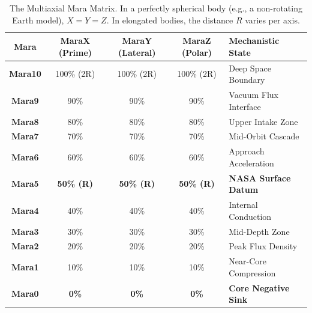 \documentclass[11pt, a4paper]{article}
\begin{document}
\begin{table}[!ht]
  \centering
  \begin{tabular}{|c|c|c|c|l|}
    \hline
    \textbf{Mara} & \textbf{MaraX (Prime)} & \textbf{MaraY (Lateral)} & \textbf{MaraZ (Polar)} & \textbf{Mechanistic State} \\ \hline
    \textbf{Mara10} & 100\% (2R) & 100\% (2R) & 100\% (2R) & Deep Space Boundary \\ \hline
    \textbf{Mara9} & 90\% & 90\% & 90\% & Vacuum Flux Interface \\ \hline
    \textbf{Mara8} & 80\% & 80\% & 80\% & Upper Intake Zone \\ \hline
    \textbf{Mara7} & 70\% & 70\% & 70\% & Mid-Orbit Cascade \\ \hline
    \textbf{Mara6} & 60\% & 60\% & 60\% & Approach Acceleration \\ \hline
    \textbf{Mara5} & \textbf{50\% (R)} & \textbf{50\% (R)} & \textbf{50\% (R)} & \textbf{NASA Surface Datum} \\ \hline
    \textbf{Mara4} & 40\% & 40\% & 40\% & Internal Conduction \\ \hline
    \textbf{Mara3} & 30\% & 30\% & 30\% & Mid-Depth Zone \\ \hline
    \textbf{Mara2} & 20\% & 20\% & 20\% & Peak Flux Density \\ \hline
    \textbf{Mara1} & 10\% & 10\% & 10\% & Near-Core Compression \\ \hline
    \textbf{Mara0} & \textbf{0\%} & \textbf{0\%} & \textbf{0\%} & \textbf{Core Negative Sink} \\ \hline
  \end{tabular}
  \caption{The Multiaxial Mara Matrix. In a perfectly spherical body (e.g., a non-rotating Earth model), $X=Y=Z$. In elongated bodies, the distance $R$ varies per axis.}
\end{table}
\end{document}
